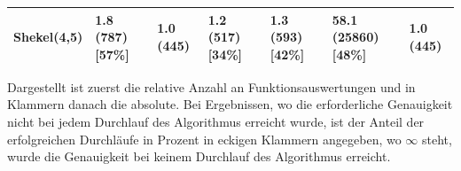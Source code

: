 \documentclass[fontsize=12, a4aper]{scrartcl}
\begin{document}
\begin{table}[H]
\begin{tabularx}{\linewidth}{X X X X X X X}
			Shekel(4,5) & 1.8 (787) [57\%] & \textbf{1.0} (445) & 1.2 (517) [34\%] & 1.3 (593) [42\%] & 58.1 (25860) [48\%] & \textbf{1.0} (445)\\
			
			\bottomrule
			
		\end{tabularx}
		
		\smallskip
		
		Dargestellt ist zuerst die relative Anzahl an Funktionsauswertungen und in Klammern danach die absolute. Bei Ergebnissen, wo die erforderliche Genauigkeit nicht bei jedem Durchlauf des Algorithmus erreicht wurde, ist der Anteil der erfolgreichen Durchläufe in Prozent in eckigen Klammern angegeben, wo \(\infty\) steht, wurde die Genauigkeit bei keinem Durchlauf des Algorithmus erreicht.\hfill\newline
		
	\end{table}
	
\end{document}
